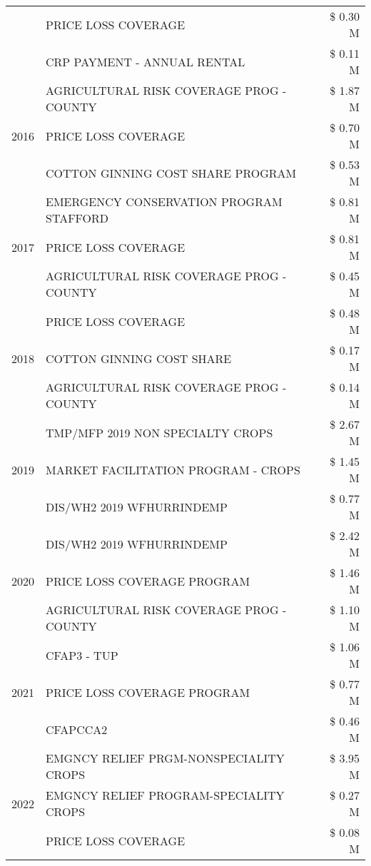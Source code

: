 \begin{tabular}{llr}
 & PRICE LOSS COVERAGE & \$ 0.30 M \\
 & CRP PAYMENT - ANNUAL RENTAL & \$ 0.11 M \\
\cline{1-3}
\multirow[t]{3}{*}{2016} & AGRICULTURAL RISK COVERAGE PROG - COUNTY & \$ 1.87 M \\
 & PRICE LOSS COVERAGE & \$ 0.70 M \\
 & COTTON GINNING COST SHARE PROGRAM & \$ 0.53 M \\
\cline{1-3}
\multirow[t]{3}{*}{2017} & EMERGENCY CONSERVATION PROGRAM STAFFORD & \$ 0.81 M \\
 & PRICE LOSS COVERAGE & \$ 0.81 M \\
 & AGRICULTURAL RISK COVERAGE PROG - COUNTY & \$ 0.45 M \\
\cline{1-3}
\multirow[t]{3}{*}{2018} & PRICE LOSS COVERAGE & \$ 0.48 M \\
 & COTTON GINNING COST SHARE & \$ 0.17 M \\
 & AGRICULTURAL RISK COVERAGE PROG - COUNTY & \$ 0.14 M \\
\cline{1-3}
\multirow[t]{3}{*}{2019} & TMP/MFP 2019 NON SPECIALTY CROPS & \$ 2.67 M \\
 & MARKET FACILITATION PROGRAM - CROPS & \$ 1.45 M \\
 & DIS/WH2 2019 WFHURRINDEMP & \$ 0.77 M \\
\cline{1-3}
\multirow[t]{3}{*}{2020} & DIS/WH2 2019 WFHURRINDEMP & \$ 2.42 M \\
 & PRICE LOSS COVERAGE PROGRAM & \$ 1.46 M \\
 & AGRICULTURAL RISK COVERAGE PROG - COUNTY & \$ 1.10 M \\
\cline{1-3}
\multirow[t]{3}{*}{2021} & CFAP3 - TUP & \$ 1.06 M \\
 & PRICE LOSS COVERAGE PROGRAM & \$ 0.77 M \\
 & CFAPCCA2 & \$ 0.46 M \\
\cline{1-3}
\multirow[t]{3}{*}{2022} & EMGNCY RELIEF PRGM-NONSPECIALITY CROPS & \$ 3.95 M \\
 & EMGNCY RELIEF PROGRAM-SPECIALITY CROPS & \$ 0.27 M \\
 & PRICE LOSS COVERAGE & \$ 0.08 M \\
\cline{1-3}
\bottomrule
\end{tabular}
